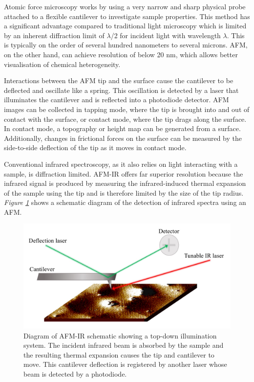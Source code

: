 Atomic force microscopy works by using a very narrow and sharp physical probe attached to a flexible cantilever to investigate sample properties. This method has a significant advantage compared to traditional light microscopy which is limited by an inherent diffraction limit of $\lambda$/2 for incident light with wavelength $\lambda$. This is typically on the order of several hundred nanometers to several microns. AFM, on the other hand, can achieve resolution of below 20 nm, which allows better visualisation of chemical heterogeneity.~\autocite{dazzi2017} 

Interactions between the AFM tip and the surface cause the cantilever to be deflected and oscillate like a spring. This oscillation is detected by a laser that illuminates the cantilever and is reflected into a photodiode detector. AFM images can be collected in tapping mode, where the tip is brought into and out of contact with the surface, or contact mode, where the tip drags along the surface. In contact mode, a topography or height map can be generated from a surface. Additionally, changes in frictional forces on the surface can be measured by the side-to-side deflection of the tip as it moves in contact mode.~\autocite{friction_afm} 

Conventional infrared spectroscopy, as it also relies on light interacting with a sample, is diffraction limited. AFM-IR offers far superior resolution because the infrared signal is produced by measuring the infrared-induced thermal expansion of the sample using the tip and is therefore limited by the size of the tip radius.~\autocite{dazzi2017,kurouski} \textit{Figure \ref{fig:afm_diagram}} shows a schematic diagram of the detection of infrared spectra using an AFM. 

\begin{figure}[H]
\centering
  \includegraphics[width=\linewidth]{afm_diagram}
\caption[Diagram of AFM-IR schematic showing a top-down illumination system.]{Diagram of AFM-IR schematic showing a top-down illumination system. The incident infrared beam is absorbed by the sample and the resulting thermal expansion causes the tip and cantilever to move. This cantilever deflection is registered by another laser whose beam is detected by a photodiode.~\autocite{Morsch,dazzi2017}}
\label{fig:afm_diagram}
\end{figure}

